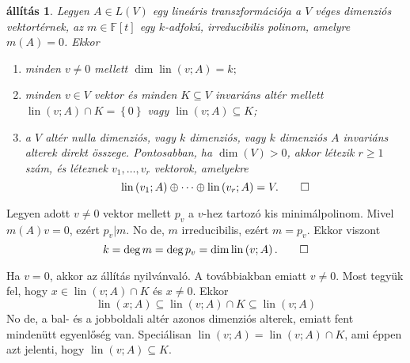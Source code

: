 \documentclass[a4paper, showtrims]{memoir}
\makeatletter
\renewenvironment{proof}[1][\proofname]
    {\par\pushQED{\qed}%
    \normalfont \topsep6\p@\@plus6\p@\relax
    \trivlist
    \item[\hskip\labelsep
        \itshape
    #1\@addpunct{:}]\ignorespaces}
    {\popQED\endtrivlist\@endpefalse}
\theoremstyle{plain}
\newtheorem{proposition}{állítás}[chapter]
\theoremstyle{remark}
\theoremstyle{definition}
\DeclareMathOperator{\lin}{lin}
\makeatother
\begin{document}
\begin{proposition}\label{pr:irred_redukcio}
	Legyen $A\in L\left( V \right)$ egy lineáris transzformációja a $V$ véges dimenziós vektortérnek,
	az $m\in\mathbb{F}\left[ t \right]$ egy $k$-adfokú, irreducibilis polinom, amelyre $m\left( A \right)=0$.
	Ekkor
	\begin{enumerate}
		\item minden $v\neq 0$ mellett
		      \begin{math}
			      \dim\lin\left( v;A \right)=k;
		      \end{math}
		\item
		      minden $v\in V$ vektor és minden $K\subseteq V$ invariáns altér mellett
		      $\lin\left( v;A \right)\cap K=\left\{ 0 \right\}$ vagy
		      $\lin\left( v;A \right)\subseteq K$;
		\item
		      a $V$ altér nulla dimenziós,
		      vagy $k$ dimenziós,
		      vagy $k$ dimenziós $A$ invariáns alterek direkt összege.
		      Pontosabban,
		      ha $\dim(V)>0$, akkor létezik $r\geq 1$ szám,
		      és léteznek $v_1,\ldots,v_r$ vektorok, amelyekre
		      \[
			      \lin\left( v_1;A \right)\oplus\dots\oplus \lin\left( v_r;A \right)=V.
			      \qedhere
		      \]
	\end{enumerate}
\end{proposition}
\begin{proof}[Bizonyítás (1.)]
	Legyen adott $v\neq 0$ vektor mellett $p_v$ a $v$-hez tartozó kis minimálpolinom.
	Mivel $m\left( A \right)v=0$, ezért $p_v|m$.
	No de, $m$ irreducibilis, ezért $m=p_v$.
	Ekkor viszont
	\[
		k=\deg m=\deg p_v
		=
		\dim\lin\left( v;A \right).\qedhere
	\]
\end{proof}
\begin{proof}[Bizonyítás (2.)]
	Ha $v=0$, akkor az állítás nyilvánvaló.
	A továbbiakban emiatt $v\neq 0$.
	Most tegyük fel, hogy $x\in\lin\left( v;A \right)\cap K$ és $x\neq 0$.
	Ekkor
	\[
		\lin\left( x;A \right)
		\subseteq
		\lin\left( v;A \right)\cap K
		\subseteq
		\lin\left( v;A \right)
	\]
	No de,
	a bal- és a jobboldali altér azonos dimenziós alterek,
	emiatt fent mindenütt egyenlőség van.
	Speciálisan
	$\lin\left( v;A \right)=\lin\left( v;A \right)\cap K$,
	ami éppen azt jelenti,
	hogy
	$\lin\left( v;A \right)\subseteq K.$
\end{proof}
\end{document}
